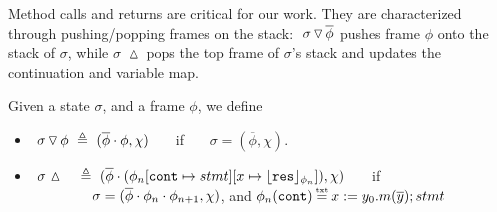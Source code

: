  
Method calls and returns are  critical for our work. 
They are characterized through pushing/popping   frames on the stack:
$  \ {\sigma} \, {\triangledown}\, \overline{\phi} $ pushes 
frame $\phi$ onto the stack of $\sigma$, while
$\sigma$ $\, {\vartriangle}\,$   pops the top frame of $\sigma$'s stack and updates the continuation and variable map.

 
 
 
 
\begin{definition}
\label{def:push:frame}
Given a state $\sigma$, and a frame $\phi$,  we define
\begin{itemize}
\item
 $  \ {\sigma} \, {\triangledown}\, {\phi}  \ \triangleq \ ({\overline{\phi}\cdot\phi}, \chi)$ \ \ \  if \ \ \  $\sigma=(\overline{\phi}, \chi)$.
\item
$ \ \sigma\, \popSymbol \ \ \  \triangleq\   { (\overline{\phi}\cdot (\phi_n[\prg{cont}\mapsto stmt][x \mapsto \interpret {\phi_n}{\prg{res}}]), \chi)}$ \ \ \  if \\
 $\strut \hspace{1.5cm} \sigma=(\overline{\phi}\cdot\phi_n\cdot\phi_{n+1}, \chi)$, and $\phi_n(\prg{cont})\txteq x:= y_0.m(\overline y); stmt $
\end{itemize}
 \end{definition}

